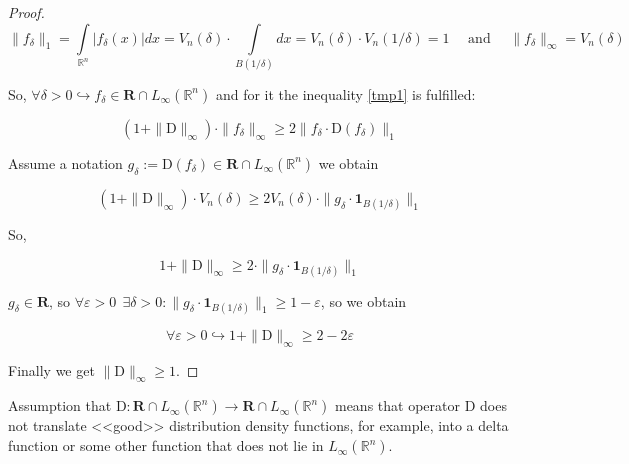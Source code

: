 \documentclass{article}
\begin{document}
\begin{proof}
        \begin{equation*}
            \|f_{\delta}\|_1 = \int\limits_{\mathbb{R}^n} |f_{\delta}(x)|dx = V_n(\delta) \cdot \int\limits_{B(1/\delta)}dx = V_n(\delta) \cdot V_n(1/\delta) = 1
            \quad \text{ and } \quad \|f_{\delta}\|_{\infty} = V_n(\delta)
        \end{equation*}

        So, $\forall \delta > 0 \hookrightarrow f_{\delta} \in \mathbf{R} \cap L_{\infty}(\mathbb{R}^n)$ and for it the inequality \eqref{tmp1} is fulfilled:

        \begin{equation*}
            (1 + \|\text{D}\|_{\infty}) \cdot \|f_{\delta}\|_{\infty} \geq 2 \|f_{\delta} \cdot \text{D}(f_{\delta})\|_1
        \end{equation*}

        Assume a notation $g_{\delta} := \text{D}(f_{\delta}) \in \mathbf{R} \cap L_{\infty}(\mathbb{R}^n)$ we obtain
        
        \begin{equation*}
            (1 + \|\text{D}\|_{\infty}) \cdot V_n(\delta) \geq 2 V_n(\delta) \cdot \|g_{\delta} \cdot \textbf{1}_{B(1/\delta)}\|_1 
        \end{equation*}

        So,

        \begin{equation*}
            1 + \|\text{D}\|_{\infty} \geq 2 \cdot \|g_{\delta} \cdot \textbf{1}_{B(1/\delta)}\|_1
        \end{equation*}

        $g_{\delta} \in \mathbf{R}$, so $\forall \varepsilon > 0 ~~ \exists \delta > 0 : \|g_{\delta} \cdot \textbf{1}_{B(1/\delta)}\|_1 \geq 1 - \varepsilon$, so we obtain

        \begin{equation*}
            \forall \varepsilon > 0 \hookrightarrow 1 + \|\text{D}\|_{\infty} \geq 2 - 2 \varepsilon
        \end{equation*}

        Finally we get $\|\text{D}\|_{\infty} \geq 1$.        
    \end{proof}

    Assumption that $\text{D} : \mathbf{R} \cap L_{\infty}(\mathbb{R}^n) \to \mathbf{R} \cap L_{\infty}(\mathbb{R}^n)$ means that operator $\text{D}$ does not translate <<good>> distribution density functions, for example, into a delta function or some other function that does not lie in $L_{\infty}(\mathbb{R}^n)$. 
    
\end{document}
